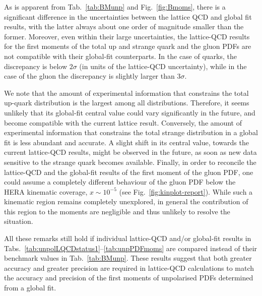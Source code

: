 As is apparent from Tab.~\ref{tab:BMunp} and Fig.~\ref{fig:Bmoms}, there is a 
significant difference in the uncertainties between the lattice QCD and 
global fit results, with the latter always about one order of magnitude 
smaller than the former.
%
Moreover, even within their large uncertainties, the lattice-QCD results 
for the first moments of the total up and strange quark and the gluon PDFs
are not compatible with their global-fit counterparts.
%
In the case of quarks, the discrepancy is below $2\sigma$ (in units of the 
lattice-QCD uncertainty), while in the case of the gluon the discrepancy is
slightly larger than $3\sigma$.

We note that the amount of experimental information that constrains the
total up-quark distribution is the largest among all distributions.
%
Therefore, it seems unlikely that its global-fit central value could vary 
significantly in the future, and become compatible with the current
lattice result.
%
Conversely, the amount of experimental information that constrains the
total strange distribution in a global fit is less abundant and accurate.
%
A slight shift in its central value, towards the current lattice-QCD results,
might be observed in the future, as soon as new data sensitive to the strange 
quark becomes available.
%
Finally, in order to reconcile the lattice-QCD and the global-fit results
of the first moment of the gluon PDF, one could assume a completely
different behaviour of the gluon PDF below the HERA kinematic
coverage, $x\sim 10^{-5}$ (see Fig.~\ref{fig:kinplot-report}).
%
While such a kinematic region remains completely unexplored,
in general the contribution of this region to the moments are negligible
and thus unlikely to resolve the situation. 

All these remarks still hold if individual lattice-QCD and/or global-fit
results in Tabs.~\ref{tab:unpolLQCDstatus1}--\ref{tab:unpPDFmoms} are 
compared instead of their benchmark values in Tab.~\ref{tab:BMunp}. 
%
These results suggest that both greater accuracy and greater precision are
required in lattice-QCD calculations to match the accuracy and 
precision of the first moments of unpolarised PDFs determined from a global
fit.

